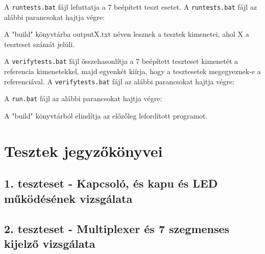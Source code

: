 A \texttt{runtests.bat} fájl lefuttatja a 7 beépített teszt esetet.
A \texttt{runtests.bat} fájl az alábbi parancsokat hajtja végre:

A "build" könyvtárba outputX.txt néven lesznek a tesztek kimenetei, ahol X a teszteset számát jelüli.

A \texttt{verifytests.bat} fájl összehasonlítja a 7 beépített teszteset kimenetét a referencia kimenetekkel, majd egyenkét kiírja, hogy a tesztesetek megegyeznek-e a referenciával.
A \texttt{verifytests.bat} fájl az alábbi parancsokat hajtja végre:



A \texttt{run.bat} fájl az alábbi parancsokat hajtja végre:

A "build" könyvtárból elindítja az előzőleg lefordított programot.










\section{Tesztek jegyzőkönyvei}

\subsection{1. teszteset - Kapcsoló, és kapu és LED működésének vizsgálata}

\subsection{2. teszteset - Multiplexer és 7 szegmenses kijelző vizsgálata}

